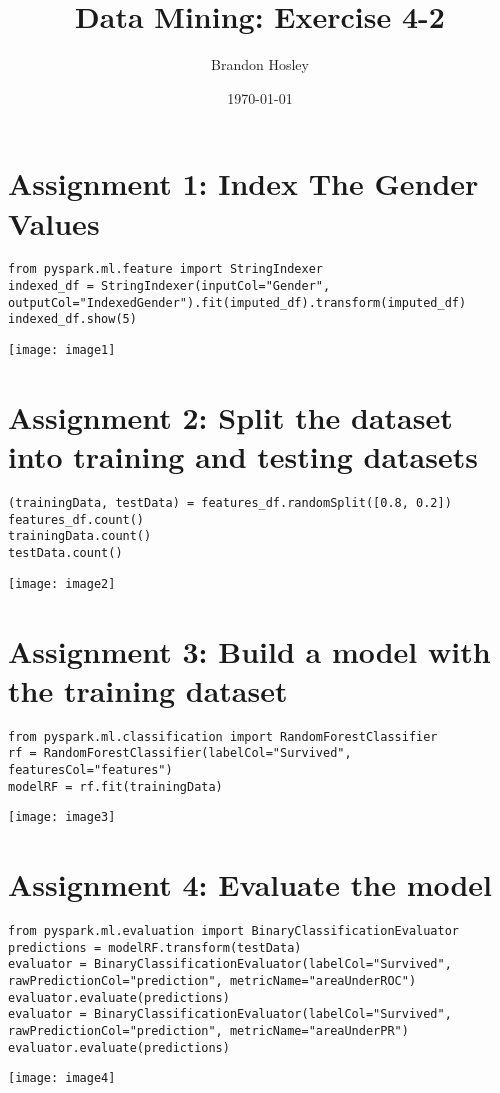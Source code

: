 \documentclass[]{article}
\title{Data Mining: Exercise 4-2}
\author{Brandon Hosley}
\date{\today}
\begin{document}
\maketitle

\section*{Assignment 1: Index The Gender Values}

\begin{verbatim}
from pyspark.ml.feature import StringIndexer
indexed_df = StringIndexer(inputCol="Gender", outputCol="IndexedGender").fit(imputed_df).transform(imputed_df)
indexed_df.show(5)
\end{verbatim}
\texttt{[image: image1]}


\section*{Assignment 2: Split the dataset into training and testing datasets}

\begin{verbatim}
(trainingData, testData) = features_df.randomSplit([0.8, 0.2])
features_df.count()
trainingData.count()
testData.count()
\end{verbatim}
\texttt{[image: image2]}


\section*{Assignment 3: Build a model with the training dataset}

\begin{verbatim}
from pyspark.ml.classification import RandomForestClassifier
rf = RandomForestClassifier(labelCol="Survived", featuresCol="features")
modelRF = rf.fit(trainingData)
\end{verbatim}
\texttt{[image: image3]}


\section*{Assignment 4: Evaluate the model}

\begin{verbatim}
from pyspark.ml.evaluation import BinaryClassificationEvaluator
predictions = modelRF.transform(testData)
evaluator = BinaryClassificationEvaluator(labelCol="Survived", rawPredictionCol="prediction", metricName="areaUnderROC")
evaluator.evaluate(predictions)
evaluator = BinaryClassificationEvaluator(labelCol="Survived", rawPredictionCol="prediction", metricName="areaUnderPR")
evaluator.evaluate(predictions)
\end{verbatim}
\texttt{[image: image4]}
\end{document}
